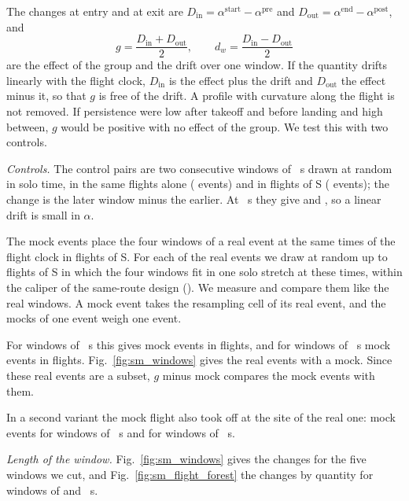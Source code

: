 \documentclass[aps,prl,twocolumn,superscriptaddress,nofootinbib]{revtex4-2}
\begin{document}
The changes at entry and at exit are
$D_\mathrm{in} = \alpha^\mathrm{start} - \alpha^\mathrm{pre}$ and $D_\mathrm{out} =
\alpha^\mathrm{end} - \alpha^\mathrm{post}$, and
\begin{equation}
g = \frac{D_\mathrm{in} + D_\mathrm{out}}{2}, \qquad d_w = \frac{D_\mathrm{in} - D_\mathrm{out}}{2}
\end{equation}
are the effect of the group and the drift over one window. If the quantity drifts linearly with the
flight clock, $D_\mathrm{in}$ is the effect plus the drift and $D_\mathrm{out}$ the effect minus it,
so that $g$ is free of the drift. A profile with curvature along the flight is not removed. If
persistence were low after takeoff and before landing and high between, $g$ would be positive with no
effect of the group. We test this with two controls.

\emph{Controls.} The control pairs are two consecutive windows of \LtWinMid~s drawn at random in solo
time, in the same flights alone (\LtFltMidEventsCtrlA{} events) and in flights of S
(\LtFltMidEventsCtrlS{} events); the change is the later window minus the earlier. At \LtLagOne~s they
give \LtFltMidCtrlAAlphaK{} and \LtFltMidCtrlSAlphaK{}, so a linear drift is small in $\alpha$.

The mock events place the four windows of a real event at the same times of the flight clock in flights
of S. For each of the real events we draw at random up to \PreMockK{} flights of S in which the four
windows fit in one solo stretch at these times, within the caliper of the same-route design
(\PreMockCaliper). We measure and compare them like the real windows. A mock event takes the
resampling cell of its real event, and the mocks of one event weigh one event.

For windows of \LtWinMid~s this gives \LtFltMidMockEvents{} mock events in \LtFltMidMockFlights{}
flights, and for windows of \LtWinMax~s \LtFltMaxMockEvents{} mock events in \LtFltMaxMockFlights{}
flights. Fig.~\ref{fig:sm_windows} gives the real events with a mock. Since these real events are a
subset, $g$ minus mock compares the mock events with them.

In a second variant the mock flight also took off at the site of the real one: \LtFltMidMockSiteEvents{}
mock events for windows of \LtWinMid~s and \LtFltMaxMockSiteEvents{} for windows of \LtWinMax~s.

\emph{Length of the window.} Fig.~\ref{fig:sm_windows} gives the changes for the five windows we cut,
and Fig.~\ref{fig:sm_flight_forest} the changes by quantity for windows of \LtWinMax{} and \LtWinMid~s.
\end{document}
